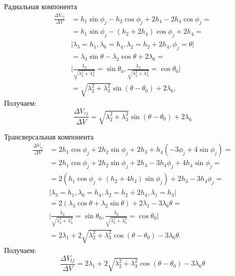 \documentclass[9pt]{beamer}
\begin{document}
\begin{frame}{Радиальная компонента}
\begin{equation*}
    \begin{aligned}
        \frac{\Delta V_{rj}}{\Delta V} &= h_1 \sin \phi_j - h_2 \cos \phi_j + 2 h_4 - 2 h_4 \cos \phi_j = \\
        &= h_1 \sin \phi_j - (h_2 + 2 h_4) \cos \phi_j + 2 h_4 = \\
        & \vert \lambda_3 = h_1, \lambda_6 = h_4, \lambda_2 = h_2 + 2 h_4, \phi_j = \theta \vert \\
        &= \lambda_3 \sin \theta - \lambda_2 \cos \theta + 2 \lambda_6 = \\
        & \vert \frac{\lambda_2}{\sqrt{\lambda_2^2 + \lambda_3^2}} = \sin \theta_0, \frac{\lambda_3}{\sqrt{\lambda_2^2 + \lambda_3^2}} = \cos \theta_0 \vert \\
        &= \sqrt{\lambda_2^2 + \lambda_3^2} \sin (\theta - \theta_0) + 2 \lambda_6.
    \end{aligned}
\end{equation*}
Получаем:
\begin{equation*}
    \boxed{\frac{\Delta V_{rj}}{\Delta V} = \sqrt{\lambda_2^2 + \lambda_3^2} \sin (\theta - \theta_0) + 2 \lambda_6}
\end{equation*}
\end{frame}

\begin{frame}{Трансверсальная компонента}
\begin{equation*}
    \begin{aligned}
        \frac{\Delta V_{tj}}{\Delta V} &= 2 h_1 \cos \phi_j + 2 h_2 \sin \phi_j + 2 h_3 + h_4 (-3 \phi_j + 4 \sin \phi_j) = \\
        &= 2 h_1 \cos \phi_j + 2 h_2 \sin \phi_j + 2 h_3 - 3 h_4 \phi_j + 4 h_4 \sin \phi_j = \\
        &= 2 \left( h_1 \cos \phi_j + (h_2 + 4 h_4) \sin \phi_j \right) + 2 h_3 - 3 h_4 \phi_j = \\
        & \vert \lambda_3 = h_1,  \lambda_6 = h_4, \lambda_2 = h_2 + 2 h_4, \lambda_1 = h_3 \vert \\
        &= 2 \left( \lambda_3 \cos \theta + \lambda_2 \sin \theta \right) + 2 \lambda_1 - 3 \lambda_6 \theta = \\
        & \vert \frac{\lambda_2}{\sqrt{\lambda_2^2 + \lambda_3^2}} = \sin \theta_0, \frac{\lambda_3}{\sqrt{\lambda_2^2 + \lambda_3^2}} = \cos \theta_0 \vert \\
        &= 2 \lambda_1 + 2 \sqrt{\lambda_2^2 + \lambda_3^2} \cos (\theta - \theta_0) - 3 \lambda_6 \theta.
    \end{aligned}
\end{equation*}
Получаем:
\begin{equation*}
    \boxed{\frac{\Delta V_{tj}}{\Delta V} = 2 \lambda_1 + 2 \sqrt{\lambda_2^2 + \lambda_3^2} \cos (\theta - \theta_0) - 3 \lambda_6 \theta} 
\end{equation*}
\end{frame}
\end{document}
